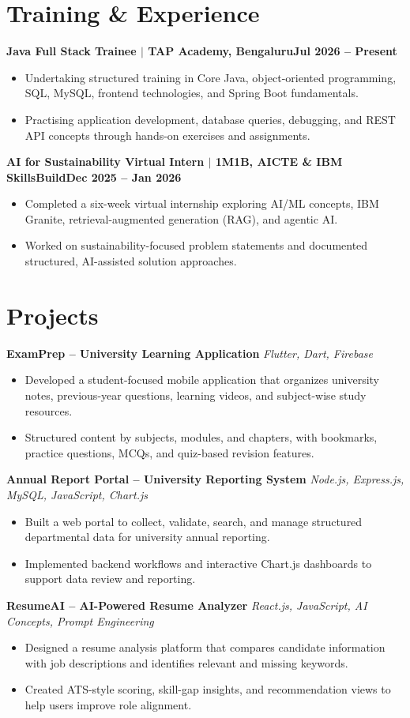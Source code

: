 \documentclass[10pt,a4paper]{article}
\newcommand{\resumeItem}[1]{\item\small{#1}}
\newcommand{\role}[2]{\textbf{#1}\hfill\textbf{#2}\\}
\newcommand{\project}[2]{\textbf{#1} \hfill {\small\textit{#2}}\\}
\begin{document}
\section{Training \& Experience}
\role{Java Full Stack Trainee $|$ TAP Academy, Bengaluru}{Jul 2026 -- Present}
\begin{itemize}
  \resumeItem{Undertaking structured training in Core Java, object-oriented programming, SQL, MySQL, frontend technologies, and Spring Boot fundamentals.}
  \resumeItem{Practising application development, database queries, debugging, and REST API concepts through hands-on exercises and assignments.}
\end{itemize}
\role{AI for Sustainability Virtual Intern $|$ 1M1B, AICTE \& IBM SkillsBuild}{Dec 2025 -- Jan 2026}
\begin{itemize}
  \resumeItem{Completed a six-week virtual internship exploring AI/ML concepts, IBM Granite, retrieval-augmented generation (RAG), and agentic AI.}
  \resumeItem{Worked on sustainability-focused problem statements and documented structured, AI-assisted solution approaches.}
\end{itemize}

\section{Projects}
\project{ExamPrep -- University Learning Application}{Flutter, Dart, Firebase}
\begin{itemize}
  \resumeItem{Developed a student-focused mobile application that organizes university notes, previous-year questions, learning videos, and subject-wise study resources.}
  \resumeItem{Structured content by subjects, modules, and chapters, with bookmarks, practice questions, MCQs, and quiz-based revision features.}
\end{itemize}
\project{Annual Report Portal -- University Reporting System}{Node.js, Express.js, MySQL, JavaScript, Chart.js}
\begin{itemize}
  \resumeItem{Built a web portal to collect, validate, search, and manage structured departmental data for university annual reporting.}
  \resumeItem{Implemented backend workflows and interactive Chart.js dashboards to support data review and reporting.}
\end{itemize}
\project{ResumeAI -- AI-Powered Resume Analyzer}{React.js, JavaScript, AI Concepts, Prompt Engineering}
\begin{itemize}
  \resumeItem{Designed a resume analysis platform that compares candidate information with job descriptions and identifies relevant and missing keywords.}
  \resumeItem{Created ATS-style scoring, skill-gap insights, and recommendation views to help users improve role alignment.}
\end{itemize}
\end{document}
